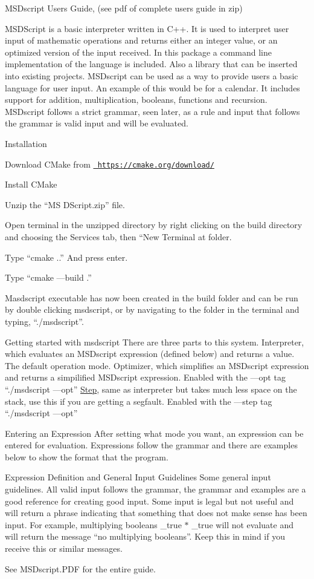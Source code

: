 M\+S\+Dscript Users Guide, (see pdf of complete users guide in zip)

M\+S\+D\+Script is a basic interpreter written in C++. It is used to interpret user input of mathematic operations and returns either an integer value, or an optimized version of the input received. In this package a command line implementation of the language is included. Also a library that can be inserted into existing projects. M\+S\+Dscript can be used as a way to provide users a basic language for user input. An example of this would be for a calendar. It includes support for addition, multiplication, booleans, functions and recursion. M\+S\+Dscript follows a strict grammar, seen later, as a rule and input that follows the grammar is valid input and will be evaluated.

Installation
\begin{DoxyEnumerate}
\item Download C\+Make from \href{https://cmake.org/download/}{\texttt{ https\+://cmake.\+org/download/}}
\item Install C\+Make
\item Unzip the “\+MS D\+Script.\+zip” file.
\item Open terminal in the unzipped directory by right clicking on the build directory and choosing the Services tab, then “\+New Terminal at folder.
\item Type “cmake ..” And press enter.
\item Type “cmake —build .”
\item Masdscript executable has now been created in the build folder and can be run by double clicking msdscript, or by navigating to the folder in the terminal and typing, “./msdscript”.
\end{DoxyEnumerate}

Getting started with msdscript There are three parts to this system. Interpreter, which evaluates an M\+S\+Dscript expression (defined below) and returns a value. The default operation mode. Optimizer, which simplifies an M\+S\+Dscript expression and returns a simpilified M\+S\+Dscript expression. Enabled with the —opt tag “./msdscript —opt” \mbox{\hyperlink{class_step}{Step}}, same as interpreter but takes much less space on the stack, use this if you are getting a segfault. Enabled with the —step tag “./msdscript —opt”

Entering an Expression After setting what mode you want, an expression can be entered for evaluation. Expressions follow the grammar and there are examples below to show the format that the program.

Expression Definition and General Input Guidelines Some general input guidelines. All valid input follows the grammar, the grammar and examples are a good reference for creating good input. Some input is legal but not useful and will return a phrase indicating that something that does not make sense has been input. For example, multiplying booleans \+\_\+true $\ast$ \+\_\+true will not evaluate and will return the message “no multiplying booleans”. Keep this in mind if you receive this or similar messages.

See M\+S\+Dscript.\+P\+DF for the entire guide. 